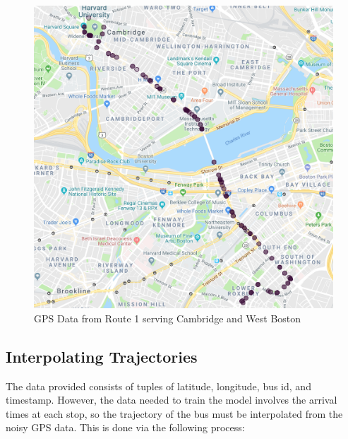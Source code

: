 \begin{figure}
\includegraphics[width=\linewidth]{images/map.png}
\caption{GPS Data from Route 1 serving Cambridge and West Boston}
\label{gps}
\end{figure}
\clearpage
\newpage

\subsection{Interpolating Trajectories}

The data provided consists of tuples of latitude, longitude, bus id, and timestamp.
However, the data needed to train the model involves the arrival times at each stop, so the trajectory of the bus must be interpolated from the noisy GPS data.
This is done via the following process:

